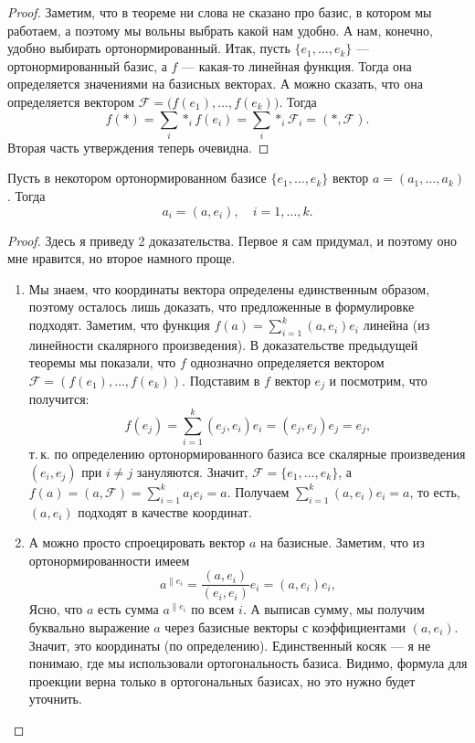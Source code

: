 \begin{proof}
    Заметим, что в теореме ни слова не сказано про базис, в котором мы работаем, а поэтому мы вольны выбрать какой нам удобно. А нам, конечно, удобно выбирать ортонормированный. Итак, пусть $\{e_1, \ldots, e_k\}$ --- ортонормированный базис, а $f$ --- какая-то линейная функция. Тогда она определяется значениями на базисных векторах. А можно сказать, что она определяется вектором $\mathcal{F} = \big(f(e_1), \ldots, f(e_k)\big)$. Тогда
    $$f(\ast) = \sum_i\ast_if(e_i) = \sum_i\ast_i\mathcal{F}_i = (\ast, \mathcal{F}).$$
    Вторая часть утверждения теперь очевидна.
\end{proof}

\begin{lemma}
    Пусть в некотором ортонормированном базисе $\{e_1, \ldots, e_k\}$ вектор $a = (a_1, \ldots, a_k)$. Тогда
    $$a_i = (a, e_i),\quad i = 1, \ldots, k.$$
\end{lemma}

\begin{proof}
    Здесь я приведу 2 доказательства. Первое я сам придумал, и поэтому оно мне нравится, но второе намного проще.
    \begin{enumerate}
        \item Мы знаем, что координаты вектора определены единственным образом, поэтому осталось лишь доказать, что предложенные в формулировке подходят. Заметим, что функция $\displaystyle f(a) = \sum_{i = 1}^k(a, e_i)e_i$ линейна (из линейности скалярного произведения). В доказательстве предыдущей теоремы мы показали, что $f$ однозначно определяется вектором $\mathcal{F} = (f(e_1), \ldots, f(e_k))$. Подставим в $f$ вектор $e_j$ и посмотрим, что получится:
            $$f(e_j) = \sum_{i = 1}^k(e_j, e_i)e_i = (e_j, e_j)e_j = e_j,$$
            т.\,к. по определению ортонормированного базиса все скалярные произведения $(e_i, e_j)$ при $i \ne j$ зануляются. Значит, $\mathcal{F} = \{e_1, \ldots, e_k\}$, а $\displaystyle f(a) = (a, \mathcal{F}) = \sum_{i = 1}^ka_ie_i = a$. Получаем $\displaystyle\sum_{i = 1}^k(a, e_i)e_i = a$, то есть, $(a, e_i)$ подходят в качестве координат.
        \item А можно просто спроецировать вектор $a$ на базисные. Заметим, что из ортонормированности имеем
            $$
            a^{\parallel e_i} = \frac{(a, e_i)}{(e_i, e_i)}e_i = (a, e_i)e_i,
            $$
            Ясно, что $a$ есть сумма $a^{\parallel e_i}$ по всем $i$. А выписав сумму, мы получим буквально выражение $a$ через базисные векторы с коэффициентами $(a, e_i)$. Значит, это координаты (по определению). Единственный косяк --- я не понимаю, где мы использовали ортогональность базиса. Видимо, формула для проекции верна только в ортогональных базисах, но это нужно будет уточнить.
    \end{enumerate}
\end{proof}


